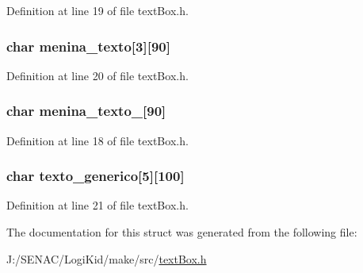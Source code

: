 Definition at line 19 of file text\-Box.\-h.

\hypertarget{struct_dialogs_ad1139eea3566e97a5846f5a2541b3159}{
\subsubsection[{menina\-\_\-texto}]{\setlength{\rightskip}{0pt plus 5cm}char menina\-\_\-texto\mbox{[}3\mbox{]}\mbox{[}90\mbox{]}}}\label{struct_dialogs_ad1139eea3566e97a5846f5a2541b3159}


Definition at line 20 of file text\-Box.\-h.

\hypertarget{struct_dialogs_a56690f345b5154a05e69cc41cc83fc8d}{
\subsubsection[{menina\-\_\-texto\-\_\-1}]{\setlength{\rightskip}{0pt plus 5cm}char menina\-\_\-texto\-\_\mbox{[}90\mbox{]}}}\label{struct_dialogs_a56690f345b5154a05e69cc41cc83fc8d}


Definition at line 18 of file text\-Box.\-h.

\hypertarget{struct_dialogs_a13184610041551aa0928d6144c5a1e42}{
\subsubsection[{texto\-\_\-generico}]{\setlength{\rightskip}{0pt plus 5cm}char texto\-\_\-generico\mbox{[}5\mbox{]}\mbox{[}100\mbox{]}}}\label{struct_dialogs_a13184610041551aa0928d6144c5a1e42}


Definition at line 21 of file text\-Box.\-h.



The documentation for this struct was generated from the following file\-:\begin{DoxyCompactItemize}
\item 
J\-:/\-S\-E\-N\-A\-C/\-Logi\-Kid/make/src/\hyperlink{text_box_8h}{text\-Box.\-h}\end{DoxyCompactItemize}
